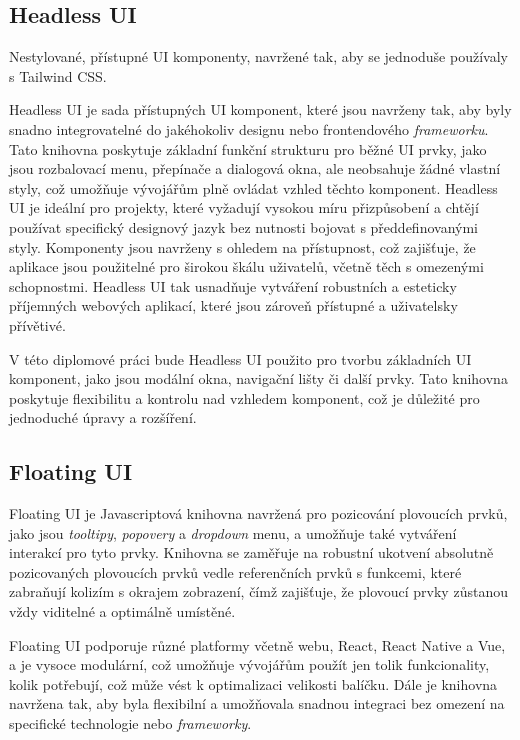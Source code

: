 \subsection{Headless UI}
Nestylované, přístupné UI komponenty, navržené tak, aby se jednoduše používaly s Tailwind CSS. \cite{HeadlessUI}

Headless UI je sada přístupných UI komponent, které jsou navrženy tak, aby byly snadno integrovatelné do jakéhokoliv designu nebo frontendového \emph{frameworku}. Tato knihovna poskytuje základní funkční strukturu pro běžné UI prvky, jako jsou rozbalovací menu, přepínače a dialogová okna, ale neobsahuje žádné vlastní styly, což umožňuje vývojářům plně ovládat vzhled těchto komponent. Headless UI je ideální pro projekty, které vyžadují vysokou míru přizpůsobení a chtějí používat specifický designový jazyk bez nutnosti bojovat s předdefinovanými styly. Komponenty jsou navrženy s ohledem na přístupnost, což zajišťuje, že aplikace jsou použitelné pro širokou škálu uživatelů, včetně těch s omezenými schopnostmi. Headless UI tak usnadňuje vytváření robustních a esteticky příjemných webových aplikací, které jsou zároveň přístupné a uživatelsky přívětivé.

V této diplomové práci bude Headless UI použito pro tvorbu základních UI komponent, jako jsou modální okna, navigační lišty či další prvky. Tato knihovna poskytuje flexibilitu a kontrolu nad vzhledem komponent, což je důležité pro jednoduché úpravy a rozšíření.

\subsection{Floating UI}
Floating UI je Javascriptová knihovna navržená pro pozicování plovoucích prvků, jako jsou \emph{tooltipy}, \emph{popovery} a \emph{dropdown} menu, a umožňuje také vytváření interakcí pro tyto prvky. Knihovna se zaměřuje na robustní ukotvení absolutně pozicovaných plovoucích prvků vedle referenčních prvků s funkcemi, které zabraňují kolizím s okrajem zobrazení, čímž zajišťuje, že plovoucí prvky zůstanou vždy viditelné a optimálně umístěné.

Floating UI podporuje různé platformy včetně webu, React, React Native a Vue, a je vysoce modulární, což umožňuje vývojářům použít jen tolik funkcionality, kolik potřebují, což může vést k optimalizaci velikosti balíčku. Dále je knihovna navržena tak, aby byla flexibilní a umožňovala snadnou integraci bez omezení na specifické technologie nebo \emph{frameworky}. \cite{FloatingUI}

